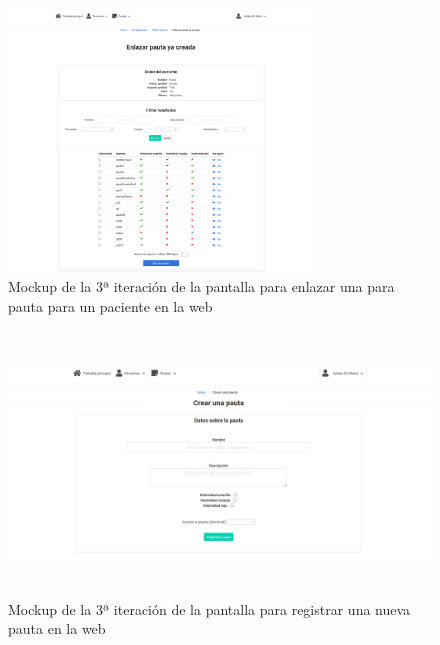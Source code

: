 \begin{figure}[H]
    \centering
    \includegraphics[height=7cm, width=\textwidth]{Imagenes/04DescProblema/mockups/v3/web/07-verPaciente-enlazarPauta.png}
    \caption[Mockup de la 3ª iteración de la pantalla para enlazar una para pauta para un paciente en la web]{Mockup de la 3ª iteración de la pantalla para enlazar una para pauta para un paciente en la web}
    \label{c4:fig:v3:web:enlazarPautaPaciente}
\end{figure}

\begin{figure}[H]
    \centering
    \includegraphics[height=7cm, width=\textwidth]{Imagenes/04DescProblema/mockups/v3/web/08-registrarPauta.png}
    \caption[Mockup de la 3ª iteración de la pantalla para registrar una nueva pauta en la web]{Mockup de la 3ª iteración de la pantalla para registrar una nueva pauta en la web}
    \label{c4:fig:v3:web:registrarPauta}
\end{figure}


